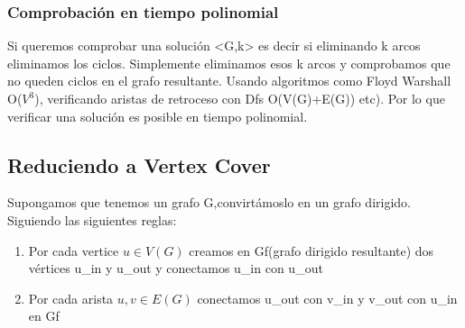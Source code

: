 \documentclass{article}
\begin{document}
	\subsubsection{Comprobación en tiempo polinomial}
	Si queremos comprobar una solución <G,k> es decir si eliminando k arcos eliminamos los ciclos. Simplemente eliminamos esos k arcos y comprobamos que no queden ciclos en el grafo resultante. Usando algoritmos como Floyd Warshall O($V^3$), verificando aristas de retroceso con Dfs O(V(G)+E(G)) etc). Por lo que verificar una solución es posible en tiempo polinomial.
	\subsection{Reduciendo a Vertex Cover}
Supongamos que tenemos un grafo G,convirtámoslo en un grafo dirigido.
Siguiendo las siguientes reglas:

\begin{enumerate}
  \item Por cada vertice $u \in V(G)$ creamos en Gf(grafo dirigido resultante) dos vértices u\_in y u\_out y conectamos u\_in con u\_out
  \item Por cada arista ${u,v} \in E(G)$ conectamos u\_out con v\_in y v\_out con u\_in en Gf
\end{enumerate}
\end{document}
